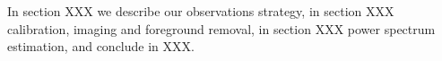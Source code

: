 










In section XXX we describe our observations strategy, in section XXX calibration, imaging and foreground removal, in section XXX power spectrum estimation, and conclude in XXX.